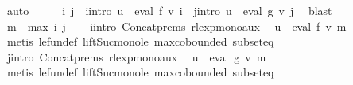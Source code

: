 \begin{isabellebody}
\ auto\isanewline
\ \ \isamarkupfalse%
\ \isamarkupfalse%
\ i\ j\ \ i{\isacharunderscore}{\kern0pt}intro{\isacharcolon}{\kern0pt}\ {\isachardoublequoteopen}u\ {\isasymin}\ eval\ f\ {\isacharparenleft}{\kern0pt}v\ i{\isacharparenright}{\kern0pt}{\isachardoublequoteclose}\ \ j{\isacharunderscore}{\kern0pt}intro{\isacharcolon}{\kern0pt}\ {\isachardoublequoteopen}u{\isacharprime}{\kern0pt}\ {\isasymin}\ eval\ g\ {\isacharparenleft}{\kern0pt}v\ j{\isacharparenright}{\kern0pt}{\isachardoublequoteclose}\ \isamarkupfalse%
\ blast\isanewline
\ \ \isamarkupfalse%
\ {\isacharquery}{\kern0pt}m\ {\isacharequal}{\kern0pt}\ {\isachardoublequoteopen}max\ i\ j{\isachardoublequoteclose}\isanewline
\ \ \isamarkupfalse%
\ i{\isacharunderscore}{\kern0pt}intro\ Concat{\isachardot}{\kern0pt}prems{\isacharparenleft}{\kern0pt}{}{\isacharparenright}{\kern0pt}\ rlexp{\isacharunderscore}{\kern0pt}mono{\isacharunderscore}{\kern0pt}aux\ \isamarkupfalse%
\ {\isachardoublequoteopen}u\ {\isasymin}\ eval\ f\ {\isacharparenleft}{\kern0pt}v\ {\isacharquery}{\kern0pt}m{\isacharparenright}{\kern0pt}{\isachardoublequoteclose}\isanewline
\ \ \ \ \isamarkupfalse%
\ {\isacharparenleft}{\kern0pt}metis\ le{\isacharunderscore}{\kern0pt}fun{\isacharunderscore}{\kern0pt}def\ lift{\isacharunderscore}{\kern0pt}Suc{\isacharunderscore}{\kern0pt}mono{\isacharunderscore}{\kern0pt}le\ max{\isachardot}{\kern0pt}cobounded{}\ subset{\isacharunderscore}{\kern0pt}eq{\isacharparenright}{\kern0pt}\isanewline
\ \ \isamarkupfalse%
\ \isamarkupfalse%
\ j{\isacharunderscore}{\kern0pt}intro\ Concat{\isachardot}{\kern0pt}prems{\isacharparenleft}{\kern0pt}{}{\isacharparenright}{\kern0pt}\ rlexp{\isacharunderscore}{\kern0pt}mono{\isacharunderscore}{\kern0pt}aux\ \isamarkupfalse%
\ {\isachardoublequoteopen}u{\isacharprime}{\kern0pt}\ {\isasymin}\ eval\ g\ {\isacharparenleft}{\kern0pt}v\ {\isacharquery}{\kern0pt}m{\isacharparenright}{\kern0pt}{\isachardoublequoteclose}\isanewline
\ \ \ \ \isamarkupfalse%
\ {\isacharparenleft}{\kern0pt}metis\ le{\isacharunderscore}{\kern0pt}fun{\isacharunderscore}{\kern0pt}def\ lift{\isacharunderscore}{\kern0pt}Suc{\isacharunderscore}{\kern0pt}mono{\isacharunderscore}{\kern0pt}le\ max{\isachardot}{\kern0pt}cobounded{}\ subset{\isacharunderscore}{\kern0pt}eq{\isacharparenright}{\kern0pt}\isanewline

\end{isabellebody}
